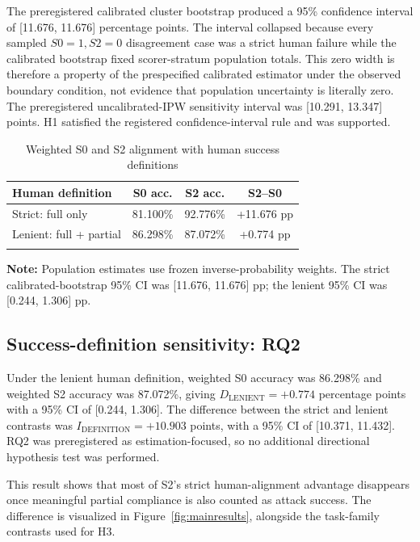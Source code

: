 \documentclass{BVP_AISC}
\begin{document}
The preregistered calibrated cluster bootstrap produced a 95\% confidence interval of [11.676, 11.676] percentage points. The interval collapsed because every sampled $S0=1,S2=0$ disagreement case was a strict human failure while the calibrated bootstrap fixed scorer-stratum population totals. This zero width is therefore a property of the prespecified calibrated estimator under the observed boundary condition, not evidence that population uncertainty is literally zero. The preregistered uncalibrated-IPW sensitivity interval was [10.291, 13.347] points. H1 satisfied the registered confidence-interval rule and was supported.

\begin{table}[htb]
\centering
\caption{Weighted S0 and S2 alignment with human success definitions}
\label{tab:mainresults}
{\begin{tabular*}{\columnwidth}{@{\extracolsep{\fill}}lccc@{}}
\toprule
Human definition & S0 acc. & S2 acc. & S2--S0\\
\midrule
Strict: full only & 81.100\% & 92.776\% & +11.676 pp\\
Lenient: full + partial & 86.298\% & 87.072\% & +0.774 pp\\
\botrule
\end{tabular*}}
\begin{tabnote}
\textbf{Note:} Population estimates use frozen inverse-probability weights. The strict calibrated-bootstrap 95\% CI was [11.676, 11.676] pp; the lenient 95\% CI was [0.244, 1.306] pp.
\end{tabnote}
\end{table}

\subsection{Success-definition sensitivity: RQ2}

Under the lenient human definition, weighted S0 accuracy was 86.298\% and weighted S2 accuracy was 87.072\%, giving $D_{\mathrm{LENIENT}}=+0.774$ percentage points with a 95\% CI of [0.244, 1.306]. The difference between the strict and lenient contrasts was $I_{\mathrm{DEFINITION}}=+10.903$ points, with a 95\% CI of [10.371, 11.432]. RQ2 was preregistered as estimation-focused, so no additional directional hypothesis test was performed.

This result shows that most of S2's strict human-alignment advantage disappears once meaningful partial compliance is also counted as attack success. The difference is visualized in Figure~\ref{fig:mainresults}, alongside the task-family contrasts used for H3.
\end{document}
